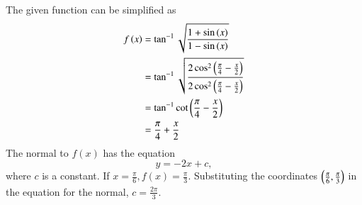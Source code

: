 The given function can be simplified as
%
\begin{align}
f\left(x\right)&=\tan ^{ -1 }{ \sqrt { \frac { 1+\sin { (x) }  }{ 1-\sin { (x) }  }  }  } \\
&= \tan ^{ -1 } \sqrt { \frac { 2 \cos ^2 \left(\frac{\pi}{4}-\frac{x}{2}\right)  }{ 2 \cos ^2 \left(\frac{\pi}{4}-\frac{x}{2}\right) }  } \\
& = \tan ^{ -1 } \cot \left(\frac{\pi}{4}-\frac{x}{2}\right) \\
& = \frac{\pi}{4}+\frac{x}{2}
\end{align}
%
The normal to $f(x)$ has the equation
%
\begin{equation}
y = -2x + c,
\end{equation}
%
where $c$ is a constant. If $x = \frac{\pi}{6}, f(x) = \frac{\pi}{3}$.  Substituting the coordinates $\left(\frac{\pi}{6},\frac{\pi}{3}\right)$ in the equation for the normal, $c = \frac{2\pi}{3}$. 

